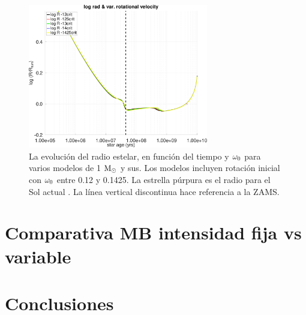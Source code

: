 \begin{figure}
	\centering
	\includegraphics[width=0.7\textwidth]{img/paper2/lograd_var_vel_g3.pdf}
	\caption{La evolución del radio estelar, en función del tiempo y $\omega_{\mathrm{0}}$ para varios modelos de 1 $\mathrm{M}_\odot$ y sus. Los modelos incluyen rotación inicial con $\omega_{\mathrm{0}}$ entre 0.12 y 0.1425. La estrella púrpura es el radio para el Sol actual \cite{Gill2012}. La línea vertical discontinua hace referencia a la ZAMS.}
	\label{fig:lograd_var_vel_g3}
\end{figure}


\section{Comparativa MB intensidad fija vs variable}
\section{Conclusiones}

\endinput

